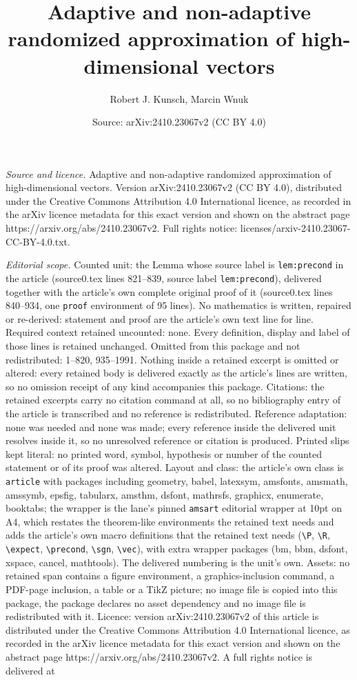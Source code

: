 \documentclass[10pt,a4paper]{amsart}
\title[Adaptive and non-adaptive randomized approximation of high-d]{Adaptive and non-adaptive randomized approximation of high-dimensional vectors}
\author{Robert J. Kunsch, Marcin Wnuk}
\date{Source: arXiv:2410.23067v2 (CC BY 4.0)}
\begin{document}
\maketitle

\noindent\emph{Source and licence.} Adaptive and non-adaptive randomized approximation of high-dimensional vectors. Version arXiv:2410.23067v2 (CC BY 4.0), distributed under the Creative Commons Attribution 4.0 International licence, as recorded in the arXiv licence metadata for this exact version and shown on the abstract page https://arxiv.org/abs/2410.23067v2. Full rights notice: licenses/arxiv-2410.23067-CC-BY-4.0.txt.\par\smallskip

\noindent\textit{Editorial scope.} Counted unit: the Lemma whose source label is \texttt{lem:precond} in the article (source0.tex lines 821--839, source label \texttt{lem:precond}), delivered together with the article's own complete original proof of it (source0.tex lines 840--934, one \texttt{proof} environment of 95 lines). No mathematics is written, repaired or re-derived: statement and proof are the article's own text line for line. Required context retained uncounted: none. Every definition, display and label of those lines is retained unchanged. Omitted from this package and not redistributed: 1--820, 935--1991. Nothing inside a retained excerpt is omitted or altered: every retained body is delivered exactly as the article's lines are written, so no omission receipt of any kind accompanies this package. Citations: the retained excerpts carry no citation command at all, so no bibliography entry of the article is transcribed and no reference is redistributed. Reference adaptation: none was needed and none was made; every reference inside the delivered unit resolves inside it, so no unresolved reference or citation is produced. Printed slips kept literal: no printed word, symbol, hypothesis or number of the counted statement or of its proof was altered. Layout and class: the article's own class is \texttt{article} with packages including geometry, babel, latexsym, amsfonts, amsmath, amssymb, epsfig, tabularx, amsthm, dsfont, mathrsfs, graphicx, enumerate, booktabs; the wrapper is the lane's pinned \texttt{amsart} editorial wrapper at 10pt on A4, which restates the theorem-like environments the retained text needs and adds the article's own macro definitions that the retained text needs (\texttt{\textbackslash P}, \texttt{\textbackslash R}, \texttt{\textbackslash expect}, \texttt{\textbackslash precond}, \texttt{\textbackslash sgn}, \texttt{\textbackslash vec}), with extra wrapper packages (bm, bbm, dsfont, xspace, cancel, mathtools). The delivered numbering is the unit's own. Assets: no retained span contains a figure environment, a graphics-inclusion command, a PDF-page inclusion, a table or a TikZ picture; no image file is copied into this package, the package declares no asset dependency and no image file is redistributed with it. Licence: version arXiv:2410.23067v2 of this article is distributed under the Creative Commons Attribution 4.0 International licence, as recorded in the arXiv licence metadata for this exact version and shown on the abstract page https://arxiv.org/abs/2410.23067v2. A full rights notice is delivered at 
\end{document}
